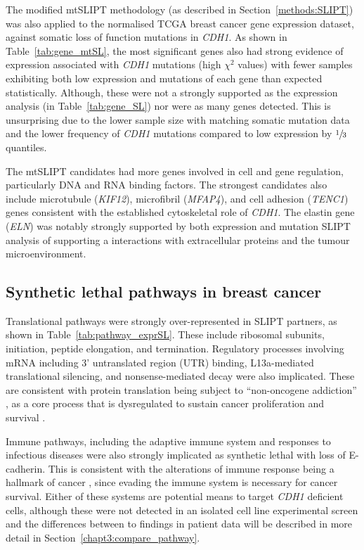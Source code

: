 The modified mtSLIPT methodology (as described in Section~\ref{methods:SLIPT}) was also applied to the normalised TCGA breast cancer gene expression dataset, against somatic loss of function mutations in \textit{CDH1}. As shown in Table~\ref{tab:gene_mtSL}, the most significant genes also had strong evidence of expression associated with \textit{CDH1} mutations (high $\chi^2$ values) with fewer samples exhibiting both low expression and mutations of each gene than expected statistically. Although, these were not a strongly supported as the expression analysis (in Table~\ref{tab:gene_SL}) nor were as many genes detected. This is unsurprising due to the lower sample size with matching somatic mutation data and the lower frequency of \textit{CDH1} mutations compared to low expression by $\sfrac{1}{3}$ quantiles.

The mtSLIPT candidates had more genes involved in cell and gene regulation, particularly DNA and RNA binding factors. The strongest candidates also include microtubule (\textit{KIF12}), microfibril (\textit{MFAP4}), and cell adhesion (\textit{TENC1}) genes consistent with the established cytoskeletal role of \textit{CDH1}. The elastin gene (\textit{ELN}) was notably strongly supported by both expression and mutation SLIPT analysis of  supporting a interactions with extracellular proteins and the tumour microenvironment.


\subsection{Synthetic lethal pathways in breast cancer} \label{chapt3:exprSL_pathways}

Translational pathways were strongly over-represented in SLIPT partners, as shown in Table~\ref{tab:pathway_exprSL}. These include ribosomal subunits, initiation, peptide elongation, and termination. Regulatory processes involving mRNA including 3' untranslated region (UTR) binding, L13a-mediated translational silencing, and nonsense-mediated decay were also implicated. These are consistent with protein translation being subject to ``non-oncogene addiction'' \citep{Luo2009}, as a core process that is dysregulated to sustain cancer proliferation and survival \citep{Gao2015}.

Immune pathways, including the adaptive immune system and responses to infectious diseases were also strongly implicated as synthetic lethal with loss of E-cadherin. This is consistent with the alterations of immune response being a hallmark of cancer \cite{Hanahan2000}, since evading the immune system is necessary for cancer survival. Either of these systems are potential means to target \textit{CDH1} deficient cells, although these were not detected in an isolated cell line experimental screen \citep{Telford2015} and the differences between to findings in patient data will be described in more detail in Section~\ref{chapt3:compare_pathway}.

